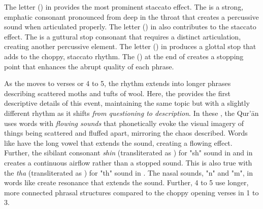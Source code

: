 The letter   () in   provides the most prominent staccato effect. The   is a strong, emphatic consonant pronounced from deep in the throat that creates a percussive sound when articulated properly. The letter   () in   also contributes to the staccato effect. The   is a guttural stop consonant that requires a distinct articulation, creating another percussive element. The letter   () in   produces a glottal stop that adds to the choppy, staccato rhythm. The   () at the end of   creates a stopping point that enhances the abrupt quality of each phrase.

As the   moves to verses or   4 to 5, the rhythm extends into longer phrases describing scattered moths and tufts of wool. Here, the   provides the first descriptive details of this event, maintaining the same topic but with a slightly different rhythm as it shifts \textit{from questioning to description}. In these  , the Qur'\=an uses words with \textit{flowing sounds} that phonetically evoke the visual imagery of things being scattered and fluffed apart, mirroring the chaos described. Words like   have the long vowel  that extends the sound, creating a flowing effect. Further, the sibilant consonant \textit{shin}  (transliterated as ) for "sh" sound in   and in   creates a continuous airflow rather than a stopped sound. This is also true with the \textit{tha}  (transliterated as ) for "th" sound in  . The nasal sounds, "n" and "m", in words like   create resonance that extends the sound. Further,   4 to 5 use longer, more connected phrasal structures compared to the choppy opening verses in   1 to 3.

